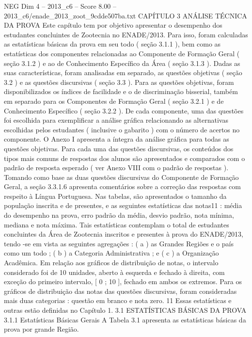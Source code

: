 \begin{textsample}{NEG Dim 4 – 2013\_c6 – Score 8.00 – 2013\_c6/enade\_2013\_zoot\_9cdde507ba.txt}  \label{ex:f4_neg_318}
CAPÍTULO 3 ANÁLISE TÉCNICA DA PROVA Este capítulo tem por objetivo apresentar o desempenho dos estudantes concluintes de Zootecnia no ENADE/2013.
Para isso, foram calculadas as estatísticas básicas da prova em seu todo ( seção 3.1.1 ), bem como as estatísticas dos componentes relacionadas ao Componente de Formação Geral ( seção 3.1.2 ) e ao de Conhecimento Específico da Área ( seção 3.1.3 ).
Dadas as suas características, foram analisadas em separado, as questões objetivas ( seção 3.2 ) e as questões discursivas ( seção 3.3 ).
Para as questões objetivas, foram disponibilizados os índices de facilidade e o de discriminação bisserial, também em separado para os Componentes de Formação Geral ( seção 3.2.1 ) e de Conhecimento Específico ( seção 3.2.2 ).
De cada componente, uma das questões foi escolhida para exemplificar a análise gráfica relacionando as alternativas escolhidas pelos estudantes ( inclusive o gabarito ) com o número de acertos no componente.
O Anexo I apresenta a íntegra da análise gráfica para todas as questões objetivas.
Para cada uma das questões discursivas, os conteúdos dos tipos mais comuns de respostas dos alunos são apresentados e comparados com o padrão de resposta esperado ( ver Anexo VIII com o padrão de respostas ).
Tomando como base as duas questões discursivas do Componente de Formação Geral, a seção 3.3.1.6 apresenta comentários sobre a correção das respostas com respeito à Língua Portuguesa.
Nas tabelas, são apresentados o tamanho da população inscrita e de presentes, e as seguintes estatísticas das notas11 : média do desempenho na prova, erro padrão da média, desvio padrão, nota mínima, mediana e nota máxima.
Tais estatísticas contemplam o total de estudantes concluintes da Área de Zootecnia inscritos e presentes à prova do ENADE/2013, tendo -se em vista as seguintes agregações : ( a ) as Grandes Regiões e o país como um todo ; ( b ) a Categoria Administrativa ; e ( c ) a Organização Acadêmica.
Em relação aos gráficos de distribuição de notas, o intervalo considerado foi de 10 unidades, aberto à esquerda e fechado à direita, com exceção do primeiro intervalo, [ 0 ; 10 ], fechado em ambos os extremos.
Para os gráficos de distribuição das notas das questões discursivas, foram consideradas mais duas categorias : questão em branco e nota zero. 11 Essas estatísticas e outras estão definidas no Capítulo 1. 3.1 ESTATÍSTICAS BÁSICAS DA PROVA 3.1.1 Estatísticas Básicas Gerais A Tabela 3.1 apresenta as estatísticas básicas da prova por grande Região.

\end{textsample}
